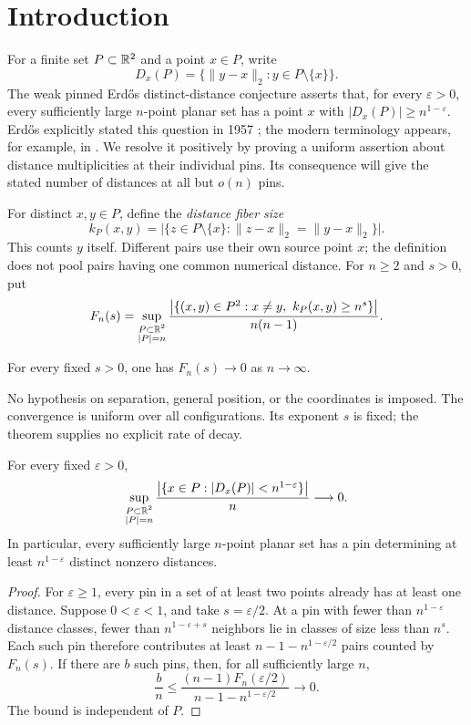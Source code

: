 \section{Introduction}\label{sec:introduction}

For a finite set $P\subset\mathbb R^2$ and a point $x\in P$, write
\[
D_x(P)=\{\lVert y-x\rVert_2:y\in P\setminus\{x\}\}.
\]
The weak pinned Erd\H{o}s distinct-distance conjecture asserts that, for
every $\varepsilon>0$, every sufficiently large $n$-point planar set has
a point $x$ with $|D_x(P)|\ge n^{1-\varepsilon}$. Erd\H{o}s explicitly
stated this question in 1957 \cite[Problem~16]{Erdos1957}; the modern
terminology appears, for example, in
\cite[Conjecture~4.7]{WeakPinned2025}. We resolve it positively by
proving a uniform assertion about distance multiplicities at their
individual pins. Its consequence will give the stated number of
distances at all but $o(n)$ pins.

For distinct $x,y\in P$, define the \emph{distance fiber size}
\[
k_P(x,y)=\bigl|\{z\in P\setminus\{x\}:
                  \lVert z-x\rVert_2=\lVert y-x\rVert_2\}\bigr|.
\]
This counts $y$ itself. Different pairs use their own source point $x$;
the definition does not pool pairs having one common numerical distance.
For $n\ge2$ and $s>0$, put
\[
F_n(s)=\sup_{\substack{P\subset\mathbb R^2\\|P|=n}}
 \frac{\bigl|\{(x,y)\in P^2:x\ne y,\ k_P(x,y)\ge n^s\}\bigr|}{n(n-1)}.
\]

\begin{theorem}\label{thm:main}
For every fixed $s>0$, one has $F_n(s)\longrightarrow0$ as
$n\longrightarrow\infty$.
\end{theorem}

No hypothesis on separation, general position, or the coordinates is
imposed. The convergence is uniform over all configurations. Its
exponent $s$ is fixed; the theorem supplies no explicit rate of decay.

\begin{corollary}\label{cor:pins}
For every fixed $\varepsilon>0$,
\[
\sup_{\substack{P\subset\mathbb R^2\\|P|=n}}
 \frac{\bigl|\{x\in P:|D_x(P)|<n^{1-\varepsilon}\}\bigr|}{n}
 \longrightarrow0.
\]
In particular, every sufficiently large $n$-point planar set has a pin
determining at least $n^{1-\varepsilon}$ distinct nonzero distances.
\end{corollary}

\begin{proof}
For $\varepsilon\ge1$, every pin in a set of at least two points already
has at least one distance. Suppose $0<\varepsilon<1$, and take
$s=\varepsilon/2$. At a pin with fewer than $n^{1-\varepsilon}$ distance
classes, fewer than $n^{1-\varepsilon+s}$ neighbors lie in classes of
size less than $n^s$. Each such pin therefore contributes at least
$n-1-n^{1-\varepsilon/2}$ pairs counted by $F_n(s)$. If there are $b$
such pins, then, for all sufficiently large $n$,
\[
\frac bn\le
 \frac{(n-1)F_n(\varepsilon/2)}{n-1-n^{1-\varepsilon/2}}
 \longrightarrow0.
\]
The bound is independent of $P$.
\end{proof}

